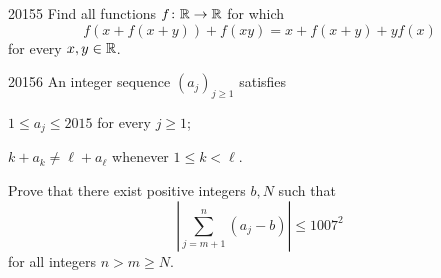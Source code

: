 \begin{problem}{2015}{5}
Find all functions $f\colon\mathbb{R}\to\mathbb{R}$ for which
\[
    f(x+f(x+y))+f(xy)=x+f(x+y)+yf(x)
\]
for every $x, y\in\mathbb{R}$.
\end{problem}

\begin{problem}{2015}{6}
An integer sequence $(a_j)_{j\geq1}$ satisfies
\begin{problemclauses}
    \item $1\leq a_j\leq2015$ for every $j\geq1$;
    \item $k+a_k\ne\ell+a_\ell$ whenever $1\leq k<\ell$.
\end{problemclauses}
Prove that there exist positive integers $b, N$ such that
\[
    \left|\sum_{j=m+1}^{n}(a_j-b)\right|\leq1007^2
\]
for all integers $n>m\geq N$.
\end{problem}
